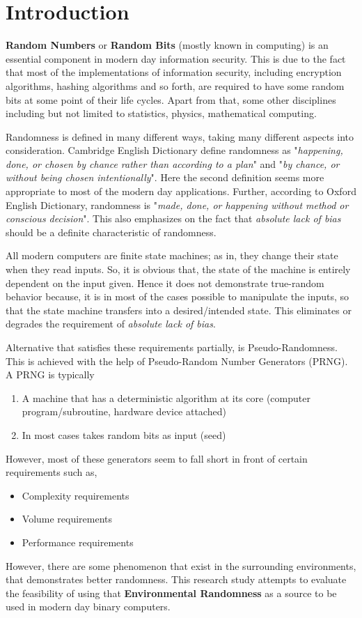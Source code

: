 \documentclass{scrartcl}
\begin{document}
\section{Introduction}
\textbf{Random Numbers} or \textbf{Random Bits} (mostly known in computing) is an essential component in modern day information security. This is due to the fact that most of the implementations of information security, including encryption algorithms, hashing algorithms and so forth, are required to have some random bits at some point of their life cycles. Apart from that, some other disciplines including but not limited to statistics, physics, mathematical computing.
\par Randomness is defined in many different ways, taking many different aspects into consideration. Cambridge English Dictionary define randomness as "\textit{happening, done, or chosen by chance rather than according to a plan}" and "\textit{by chance, or without being chosen intentionally}"\cite{web_cambridge_def_rnd}. Here the second definition seems more appropriate to most of the modern day applications. Further, according to Oxford English Dictionary, randomness is "\textit{made, done, or happening without method or conscious decision}"\cite{web_oxford_def_rnd}. This also emphasizes on the fact that \textit{absolute lack of bias} should be a definite characteristic of randomness. 
\par All modern computers are finite state machines; as in, they change their state when they read inputs. So, it is obvious that, the state of the machine is entirely dependent on the input given. Hence it does not demonstrate true-random behavior because, it is in most of the cases possible to manipulate the inputs, so that the state machine transfers into a desired/intended state. This eliminates or degrades the requirement of \textit{absolute lack of bias}.
\par Alternative that satisfies these requirements partially, is Pseudo-Randomness. This is achieved with the help of Pseudo-Random Number Generators (PRNG). A PRNG is typically
    \begin{enumerate}
        \item A machine that has a deterministic algorithm at its core (computer program/subroutine, hardware device attached)
        \item In most cases takes random bits as input (seed)
    \end{enumerate}
\par However, most of these generators seem to fall short in front of certain requirements such as,
    \begin{itemize}
        \item Complexity requirements
        \item Volume requirements
        \item Performance requirements
    \end{itemize}
\par However, there are some phenomenon that exist in the surrounding environments, that demonstrates better randomness. This research study attempts to evaluate the feasibility of using that \textbf{Environmental Randomness} as a source to be used in modern day binary computers.
\end{document}
